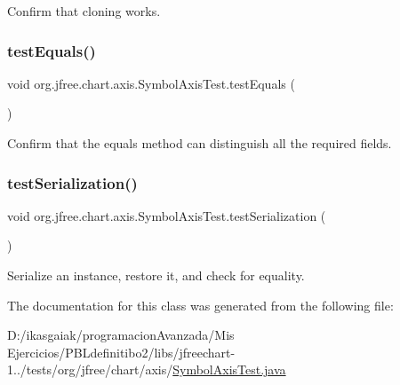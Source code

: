 Confirm that cloning works. \mbox{\label{classorg_1_1jfree_1_1chart_1_1axis_1_1_symbol_axis_test_a0ed4743eac47257030a9a236d1a8d1f5}} 
\subsubsection{\texorpdfstring{test\+Equals()}{testEquals()}}
{\footnotesize\ttfamily void org.\+jfree.\+chart.\+axis.\+Symbol\+Axis\+Test.\+test\+Equals (\begin{DoxyParamCaption}{ }\end{DoxyParamCaption})}

Confirm that the equals method can distinguish all the required fields. \mbox{\label{classorg_1_1jfree_1_1chart_1_1axis_1_1_symbol_axis_test_a9d0e27de08dd5ed6d9f855e53605346f}} 
\subsubsection{\texorpdfstring{test\+Serialization()}{testSerialization()}}
{\footnotesize\ttfamily void org.\+jfree.\+chart.\+axis.\+Symbol\+Axis\+Test.\+test\+Serialization (\begin{DoxyParamCaption}{ }\end{DoxyParamCaption})}

Serialize an instance, restore it, and check for equality. 

The documentation for this class was generated from the following file\+:\begin{DoxyCompactItemize}
\item 
D\+:/ikasgaiak/programacion\+Avanzada/\+Mis Ejercicios/\+P\+B\+Ldefinitibo2/libs/jfreechart-\/1../tests/org/jfree/chart/axis/\mbox{\hyperlink{_symbol_axis_test_8java}{Symbol\+Axis\+Test.\+java}}\end{DoxyCompactItemize}
